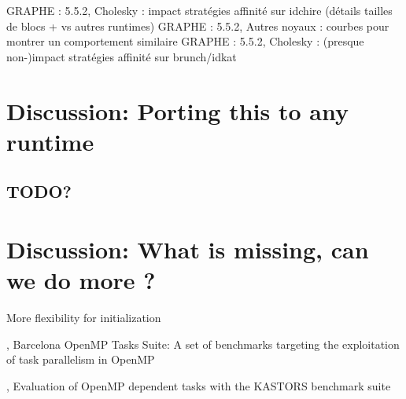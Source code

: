 GRAPHE : 5.5.2, Cholesky : impact stratégies affinité sur idchire (détails tailles de blocs + vs autres runtimes)
GRAPHE : 5.5.2, Autres noyaux : courbes pour montrer un comportement similaire
GRAPHE : 5.5.2, Cholesky : (presque non-)impact stratégies affinité sur brunch/idkat

\section{Discussion: Porting this to any runtime}
\subsection{TODO?}

\section{Discussion: What is missing, can we do more ?}
More flexibility for initialization


%

\cite{Duran2009}, Barcelona OpenMP Tasks Suite: A set of benchmarks targeting the exploitation of task parallelism in OpenMP

\cite{Virouleau2014}, Evaluation of OpenMP dependent tasks with the KASTORS benchmark suite
